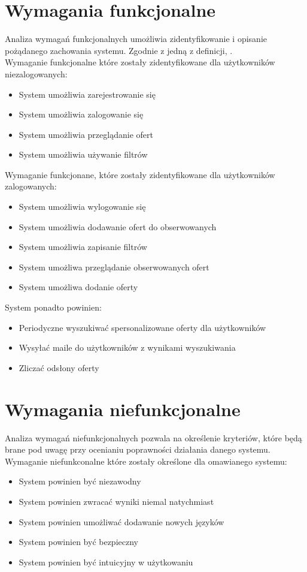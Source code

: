 \section{Wymagania funkcjonalne}
\label{sec:wymaganiaFunkcjonalne}
Analiza wymagań funkcjonalnych umożliwia zidentyfikowanie i opisanie pożądanego zachowania systemu. Zgodnie z jedną z definicji, 
.\\ Wymaganie funkcjonalne które zostały zidentyfikowane dla użytkowników niezalogowanych:
\begin{itemize}
\item System umożliwia zarejestrowanie się
\item System umożliwia zalogowanie się 
\item System umożliwia przeglądanie ofert
\item System umożliwia używanie filtrów
\end{itemize}
Wymaganie funkcjonane, które zostały zidentyfikowane dla użytkowników zalogowanych:
\begin{itemize}
\item System umożliwia wylogowanie się
\item System umożliwia dodawanie ofert do obserwowanych
\item System umożliwia zapisanie filtrów
\item System umożliwa przeglądanie obserwowanych ofert
\item System umożliwa dodanie oferty 
\end{itemize}
System ponadto powinien:
\begin{itemize}
\item Periodyczne wyszukiwać spersonalizowane oferty dla użytkowników
\item Wysyłać maile do użytkowników z wynikami wyszukiwania
\item Zliczać odsłony oferty
\end{itemize}

\section{Wymagania niefunkcjonalne}
\label{sec;wymaganiaNiefunkcjonalne}
Analiza wymagań niefunkcjonalnych pozwala na określenie kryteriów, które będą brane pod uwagę przy ocenianiu poprawności działania danego systemu. \\
Wymaganie niefunkconalne które zostały określone dla omawianego systemu:
\begin{itemize}
\item System powinien być niezawodny
\item System powinien zwracać wyniki niemal natychmiast
\item System powinien umożliwać dodawanie nowych języków
\item System powinien być bezpieczny
\item System powinien być intuicyjny w użytkowaniu
\end{itemize}

